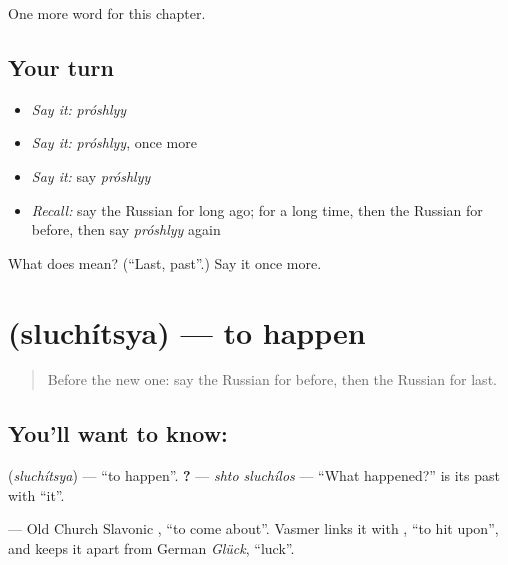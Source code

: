 \begin{grammarlens}[title={What you've built}]
One more word for this chapter.
\end{grammarlens}

\subsection*{Your turn}
\begin{itemize}
\raggedright
  \item \emph{Say it:} \emph{próshlyy}
  \item \emph{Say it:} \emph{próshlyy}, once more
  \item \emph{Say it:} say \emph{próshlyy}
  \item \emph{Recall:} say the Russian for long ago; for a long time, then the Russian for before, then say \emph{próshlyy} again
\end{itemize}

\begin{tcolorbox}[breakable,colback=teal!4,colframe=teal!35!black,title={Before you move on}]
What does  mean? (\textquotedblleft{}Last, past\textquotedblright{}.) Say it once more.
\end{tcolorbox}
\section[\texorpdfstring{\ru{случиться} (sluchítsya)}{случиться (sluchítsya)}]{ (sluchítsya) — to happen}

\label{lesson:RU-C137-sluchitsya}



\begin{quote}
Before the new one: say the Russian for before, then the Russian for last.
\end{quote}

\subsection*{You'll want to know: }
\textbf{} (\emph{sluchítsya}) — \textquotedblleft{}to happen\textquotedblright{}. \textbf{ ?} — \emph{shto sluchílos} — \textquotedblleft{}What happened?\textquotedblright{} \textbf{} is its past with \textquotedblleft{}it\textquotedblright{}.

\begin{cousinweb}
\textbf{} — Old Church Slavonic \emph{ }, \textquotedblleft{}to come about\textquotedblright{}. Vasmer links it with \emph{}, \textquotedblleft{}to hit upon\textquotedblright{}, and keeps it apart from German \emph{Glück}, \textquotedblleft{}luck\textquotedblright{}.
\end{cousinweb}

